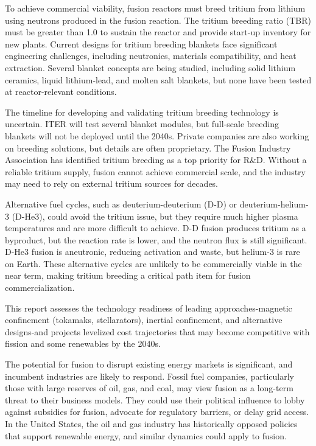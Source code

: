 \documentclass[10pt,a4paper]{article}
\begin{document}
{\small To achieve commercial viability, fusion reactors must breed tritium from lithium using neutrons produced in the fusion reaction. The tritium breeding ratio (TBR) must be greater than 1.0 to sustain the reactor and provide start-up inventory for new plants. Current designs for tritium breeding blankets face significant engineering challenges, including neutronics, materials compatibility, and heat extraction. Several blanket concepts are being studied, including solid lithium ceramics, liquid lithium-lead, and molten salt blankets, but none have been tested at reactor-relevant conditions.}\par
{\small The timeline for developing and validating tritium breeding technology is uncertain. ITER will test several blanket modules, but full-scale breeding blankets will not be deployed until the 2040s. Private companies are also working on breeding solutions, but details are often proprietary. The Fusion Industry Association has identified tritium breeding as a top priority for R\&D. Without a reliable tritium supply, fusion cannot achieve commercial scale, and the industry may need to rely on external tritium sources for decades.}\par
{\small Alternative fuel cycles, such as deuterium-deuterium (D-D) or deuterium-helium-3 (D-He3), could avoid the tritium issue, but they require much higher plasma temperatures and are more difficult to achieve. D-D fusion produces tritium as a byproduct, but the reaction rate is lower, and the neutron flux is still significant. D-He3 fusion is aneutronic, reducing activation and waste, but helium-3 is rare on Earth. These alternative cycles are unlikely to be commercially viable in the near term, making tritium breeding a critical path item for fusion commercialization.}\par
{\small This report assesses the technology readiness of leading approaches-magnetic confinement (tokamaks, stellarators), inertial confinement, and alternative designs-and projects levelized cost trajectories that may become competitive with fission and some renewables by the 2040s.}\par
{}\par\vspace{1pt}
{\small The potential for fusion to disrupt existing energy markets is significant, and incumbent industries are likely to respond. Fossil fuel companies, particularly those with large reserves of oil, gas, and coal, may view fusion as a long-term threat to their business models. They could use their political influence to lobby against subsidies for fusion, advocate for regulatory barriers, or delay grid access. In the United States, the oil and gas industry has historically opposed policies that support renewable energy, and similar dynamics could apply to fusion.}\par
\end{document}

